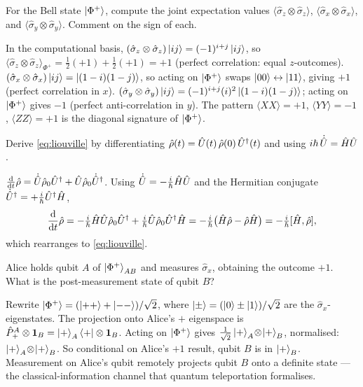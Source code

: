 \begin{exercise}
For the Bell state $\ket{\Phi^+}$, compute the joint expectation
values $\langle\hat\sigma_z\otimes\hat\sigma_z\rangle$,
$\langle\hat\sigma_x\otimes\hat\sigma_x\rangle$, and
$\langle\hat\sigma_y\otimes\hat\sigma_y\rangle$. Comment on the
sign of each.
\begin{solution}
In the computational basis,
$(\hat\sigma_z\otimes\hat\sigma_z)\ket{ij}=(-1)^{i+j}\ket{ij}$, so
$\langle\hat\sigma_z\otimes\hat\sigma_z\rangle_{\Phi^+}
=\tfrac12(+1)+\tfrac12(+1)=+1$ (perfect correlation: equal $z$-outcomes).
$(\hat\sigma_x\otimes\hat\sigma_x)\ket{ij}=\ket{(1-i)(1-j)}$, so
acting on $\ket{\Phi^+}$ swaps $\ket{00}\leftrightarrow\ket{11}$,
giving $+1$ (perfect correlation in $x$).
$(\hat\sigma_y\otimes\hat\sigma_y)\ket{ij}=(-1)^{i+j}(i)^2\ket{(1-i)(1-j)}$;
acting on $\ket{\Phi^+}$ gives $-1$ (perfect anti-correlation in
$y$). The pattern $\langle XX\rangle=+1$, $\langle YY\rangle=-1$,
$\langle ZZ\rangle=+1$ is the diagonal signature of $\ket{\Phi^+}$.
\end{solution}
\end{exercise}

\begin{exercise}
Derive \cref{eq:liouville} by differentiating
$\hat{\rho}(t)=\hat{U}(t)\,\hat{\rho}(0)\,\hat{U}^\dagger(t)$ and using
$i\hbar\,\dot{\hat{U}}=\hat{H}\hat{U}$.
\begin{solution}
$\dv{t}\hat{\rho}=\dot{\hat{U}}\hat{\rho}_0\hat{U}^\dagger
+\hat{U}\hat{\rho}_0\dot{\hat{U}}^\dagger$. Using
$\dot{\hat{U}}=-\tfrac{i}{\hbar}\hat{H}\hat{U}$ and the Hermitian
conjugate $\dot{\hat{U}}^\dagger=+\tfrac{i}{\hbar}\hat{U}^\dagger\hat{H}$,
\[
\dv{t}\hat{\rho}=-\tfrac{i}{\hbar}\hat{H}\hat{U}\hat{\rho}_0\hat{U}^\dagger
+\tfrac{i}{\hbar}\hat{U}\hat{\rho}_0\hat{U}^\dagger\hat{H}
=-\tfrac{i}{\hbar}\bigl(\hat{H}\hat{\rho}-\hat{\rho}\hat{H}\bigr)
=-\tfrac{i}{\hbar}[\hat{H},\hat{\rho}],
\]
which rearranges to \cref{eq:liouville}.
\end{solution}
\end{exercise}

\begin{exercise}
Alice holds qubit $A$ of $\ket{\Phi^+}_{AB}$ and measures
$\hat\sigma_x$, obtaining the outcome $+1$. What is the
post-measurement state of qubit $B$?
\begin{solution}
Rewrite $\ket{\Phi^+}=(\ket{++}+\ket{--})/\sqrt 2$, where
$\ket{\pm}=(\ket{0}\pm\ket{1})/\sqrt 2$ are the
$\hat\sigma_x$-eigenstates. The projection onto Alice's $+$
eigenspace is $\hat{P}^A_+\otimes\mathbf{1}_B
=\ket{+}_A\bra{+}\otimes\mathbf{1}_B$. Acting on $\ket{\Phi^+}$ gives
$\tfrac{1}{\sqrt 2}\ket{+}_A\!\otimes\!\ket{+}_B$, normalised:
$\ket{+}_A\!\otimes\!\ket{+}_B$. So conditional on Alice's $+1$
result, qubit $B$ is in $\ket{+}_B$. Measurement on Alice's qubit
remotely projects qubit $B$ onto a definite state --- the
classical-information channel that quantum teleportation
formalises.
\end{solution}
\end{exercise}

